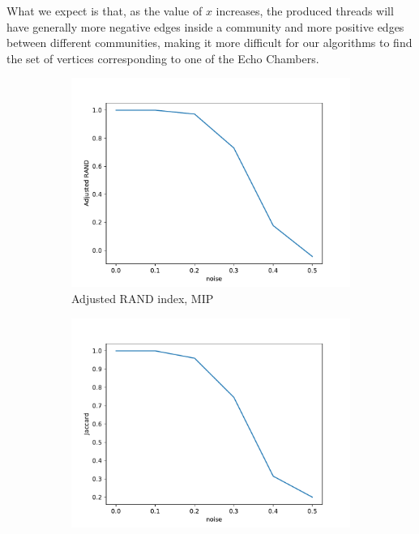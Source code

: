 What we expect is that, as the value of $x$ increases, the produced threads
will have generally more negative edges inside a community and more positive
edges between different communities, making it more difficult for our
algorithms to find the set of vertices corresponding to one of the Echo
Chambers.

\begin{figure}
	\begin{center}
		\begin{subfigure}[b]{0.4\textwidth}
			\centering
			\includegraphics[width=\textwidth]{tex/out/synthetic_exact/model2_noise_adj_rand.pdf}
			\caption{Adjusted RAND index, MIP}
			\label{fig:tex/out/synthetic_exact/model2_noise_adj_rand.pdf}
		\end{subfigure}
		\quad
		\begin{subfigure}[b]{0.4\textwidth}
			\centering
			\includegraphics[width=\textwidth]{tex/out/synthetic_exact/model2_noise_jaccard.pdf}

\end{subfigure}
\end{center}
\end{figure}
